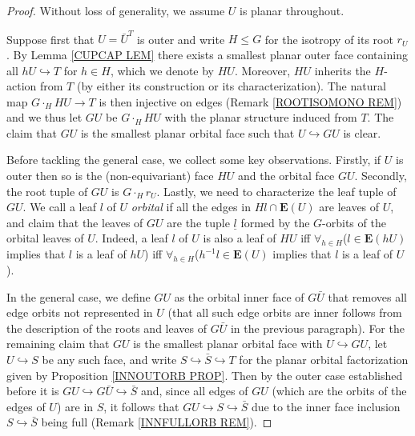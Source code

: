 \documentclass[a4paper,10pt
 ,draft
]{article}%
\begin{document}
\begin{proof} Without loss of generality, we assume $U$ is planar throughout.

Suppose first that $U=\bar{U}^T$ is outer and write $H\leq G$ for
the isotropy of its root $r_U$.
By Lemma \ref{CUPCAP LEM} there exists a smallest planar outer face 
containing all $h U \hookrightarrow T$ for $h \in H$,
which we denote by $HU$.
Moreover, $HU$ inherits the $H$-action from $T$ 
(by either its construction or its characterization).
The natural map
$G \cdot_H HU \to T$
is then injective on edges
(Remark \ref{ROOTISOMONO REM})
and we thus let $GU$ be $G \cdot_H HU$
with the planar structure induced from $T$. The claim that $GU$ is the smallest planar orbital face such that $U \hookrightarrow GU$ is clear.


	Before tackling the general case, we collect some key observations.
	Firstly, if $U$ is outer then so is the (non-equivariant) face $HU$ and the orbital face $GU$.
	Secondly, the root tuple of 
	$GU$ is $G\cdot_H r_U$.
	Lastly, we need to characterize the leaf tuple of $GU$. We call a leaf $l$ of $U$ \textit{orbital} if 
all the edges in $Hl \cap \boldsymbol{E}(U)$ are leaves of $U$, 
	and claim that the leaves of $GU$ are the tuple $\underline{l}$ formed by the $G$-orbits of the orbital leaves of $U$. 
	Indeed, a leaf $l$ of $U$ is also a leaf of $HU$ iff 
	$\forall_{h \in H}$($l \in \boldsymbol{E}(hU)$ implies that $l$ is a leaf of $hU$) iff
	$\forall_{h \in H}$($h^{-1} l \in \boldsymbol{E}(U)$ implies that $l$ is a leaf of $U$).
	
	
	In the general case, we define $GU$ as the orbital inner face of $G \bar{U}$ that removes all edge orbits not represented in $U$ 	(that all such edge orbits are inner follows from the description of the roots and leaves of $G\bar{U}$ in the previous paragraph). 
	For the remaining claim that $G U$ is the smallest planar orbital face with $U \hookrightarrow GU$, let $U \hookrightarrow S$ be any such face, and write $S \hookrightarrow \bar{S} \hookrightarrow T$ for the planar orbital factorization given by Proposition \ref{INNOUTORB PROP}.
	Then by the outer case established before it is	
	$GU \hookrightarrow G \bar{U} \hookrightarrow \bar{S}$ and, since all edges of $GU$ (which are the orbits of the edges of $U$) are in $S$, it follows that $GU \hookrightarrow S \hookrightarrow \bar{S}$ due to the inner face inclusion 
	$S \hookrightarrow \bar{S}$ being full (Remark \ref{INNFULLORB REM}).
\end{proof}
\end{document}
